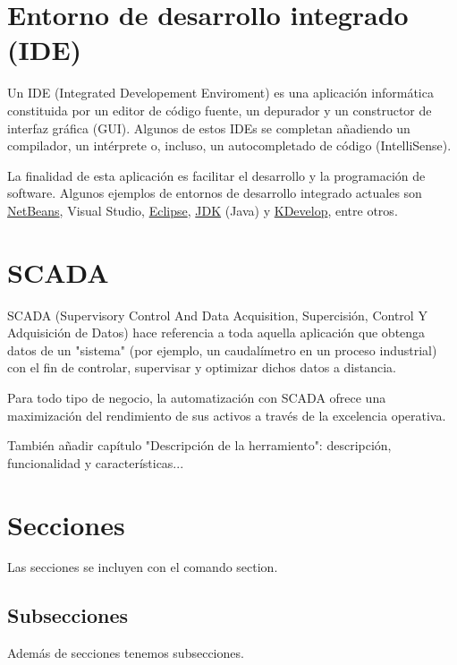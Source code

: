 \section{Entorno de desarrollo integrado (IDE)}

Un IDE (Integrated Developement Enviroment) es una aplicación informática constituida por un editor de código fuente, un depurador y un constructor de interfaz gráfica (GUI). Algunos de estos IDEs se completan añadiendo un compilador, un intérprete o, incluso, un autocompletado de código (IntelliSense).

La finalidad de esta aplicación es facilitar el desarrollo y la programación de software. Algunos ejemplos de entornos de desarrollo integrado actuales son \href{https://netbeans.org/}{NetBeans}, Visual Studio, \href{https://www.eclipse.org/}{Eclipse}, \href{https://www.oracle.com/technetwork/java/javase/downloads/jdk8-downloads-2133151.html}{JDK} (Java) y \href{https://www.kdevelop.org/}{KDevelop}, entre otros.


\section{SCADA}

SCADA (Supervisory Control And Data Acquisition, Supercisión, Control Y Adquisición de Datos) hace referencia a toda aquella aplicación que obtenga datos de un "sistema" (por ejemplo, un caudalímetro en un proceso industrial) con el fin de controlar, supervisar y optimizar dichos datos a distancia.

Para todo tipo de negocio, la automatización con SCADA ofrece una maximización del rendimiento de sus activos a través de la excelencia operativa.


También añadir capítulo "Descripción de la herramiento": descripción, funcionalidad y características...

\section{Secciones}

Las secciones se incluyen con el comando section.

\subsection{Subsecciones}

Además de secciones tenemos subsecciones.

